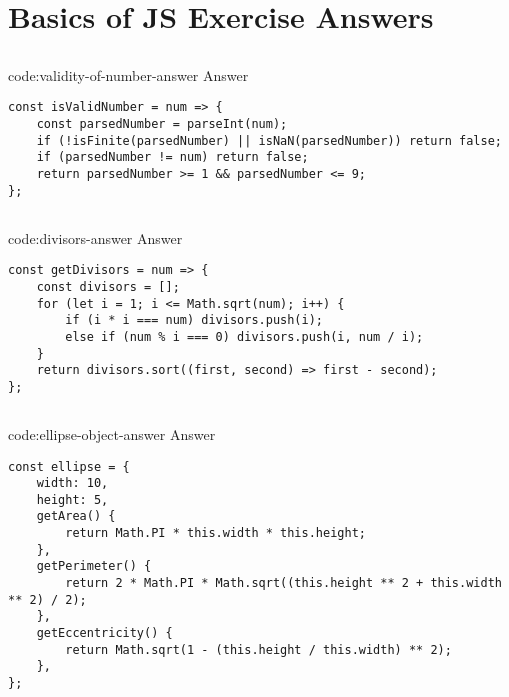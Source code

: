 \section{Basics of JS Exercise Answers}\label{sect:basic-js-exercise-answers}

\subsection*{}

\begin{codeenv}{code:validity-of-number-answer}{ Answer}\begin{verbatim}
const isValidNumber = num => {
    const parsedNumber = parseInt(num);
    if (!isFinite(parsedNumber) || isNaN(parsedNumber)) return false;
    if (parsedNumber != num) return false;
    return parsedNumber >= 1 && parsedNumber <= 9;
};
\end{verbatim}
\end{codeenv}

\subsection*{}

\begin{codeenv}{code:divisors-answer}{ Answer}\begin{verbatim}
const getDivisors = num => {
    const divisors = [];
    for (let i = 1; i <= Math.sqrt(num); i++) {
        if (i * i === num) divisors.push(i);
        else if (num % i === 0) divisors.push(i, num / i);
    }
    return divisors.sort((first, second) => first - second);
};
\end{verbatim}
\end{codeenv}

\subsection*{}

\begin{codeenv}{code:ellipse-object-answer}{ Answer}\begin{verbatim}
const ellipse = {
    width: 10,
    height: 5,
    getArea() {
        return Math.PI * this.width * this.height;
    },
    getPerimeter() {
        return 2 * Math.PI * Math.sqrt((this.height ** 2 + this.width ** 2) / 2);
    },
    getEccentricity() {
        return Math.sqrt(1 - (this.height / this.width) ** 2);
    },
};
\end{verbatim}
\end{codeenv}
